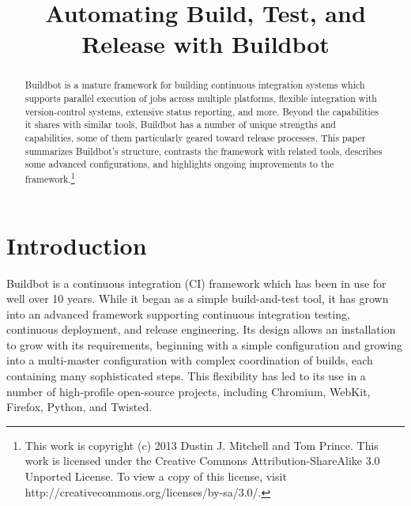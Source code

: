 \documentclass[conference]{IEEEtran}
\begin{document}
\title{Automating Build, Test, and Release with Buildbot}


\author{
}

\maketitle

\begin{abstract}
Buildbot is a mature framework for building continuous integration systems which supports parallel execution of jobs across multiple platforms, flexible integration with version-control systems, extensive status reporting, and more.
Beyond the capabilities it shares with similar tools, Buildbot has a number of unique strengths and capabilities, some of them particularly geared toward release processes.
This paper summarizes Buildbot's structure, contrasts the framework with related tools, describes some advanced configurations, and highlights ongoing improvements to the framework.\footnote{This work is copyright (c) 2013 Dustin J. Mitchell and Tom Prince.  This work is licensed under the Creative Commons Attribution-ShareAlike 3.0 Unported License. To view a copy of this license, visit http://creativecommons.org/licenses/by-sa/3.0/.}
\end{abstract}

\IEEEpeerreviewmaketitle

\section{Introduction}

Buildbot is a continuous integration (CI) framework which has been in use for well over 10 years\cite{buildbot-031}.
While it began as a simple build-and-test tool, it has grown into an advanced  framework supporting continuous integration testing, continuous deployment, and release engineering.
Its design allows an installation to grow with its requirements, beginning with a simple configuration and growing into a multi-master configuration with complex coordination of builds, each containing many sophisticated steps.
This flexibility has led to its use in a number of high-profile open-source projects, including Chromium, WebKit, Firefox, Python, and Twisted\cite{success-stories}.
\end{document}
